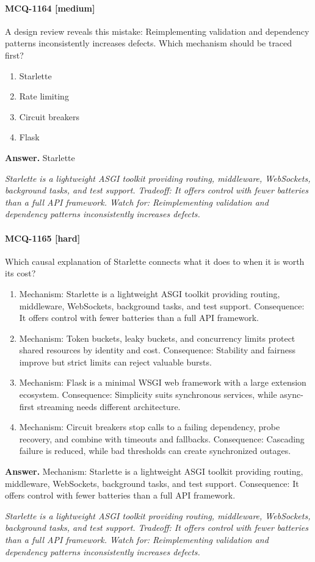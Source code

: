 \paragraph{MCQ-1164 [medium]} A design review reveals this mistake: Reimplementing validation and dependency patterns inconsistently increases defects. Which mechanism should be traced first?
\begin{enumerate}[label=\Alph*.]
\item Starlette
\item Rate limiting
\item Circuit breakers
\item Flask
\end{enumerate}
\noindent\textbf{Answer.} Starlette
\par\textit{Starlette is a lightweight ASGI toolkit providing routing, middleware, WebSockets, background tasks, and test support. Tradeoff: It offers control with fewer batteries than a full API framework. Watch for: Reimplementing validation and dependency patterns inconsistently increases defects.}
\paragraph{MCQ-1165 [hard]} Which causal explanation of Starlette connects what it does to when it is worth its cost?
\begin{enumerate}[label=\Alph*.]
\item Mechanism: Starlette is a lightweight ASGI toolkit providing routing, middleware, WebSockets, background tasks, and test support. Consequence: It offers control with fewer batteries than a full API framework.
\item Mechanism: Token buckets, leaky buckets, and concurrency limits protect shared resources by identity and cost. Consequence: Stability and fairness improve but strict limits can reject valuable bursts.
\item Mechanism: Flask is a minimal WSGI web framework with a large extension ecosystem. Consequence: Simplicity suits synchronous services, while async-first streaming needs different architecture.
\item Mechanism: Circuit breakers stop calls to a failing dependency, probe recovery, and combine with timeouts and fallbacks. Consequence: Cascading failure is reduced, while bad thresholds can create synchronized outages.
\end{enumerate}
\noindent\textbf{Answer.} Mechanism: Starlette is a lightweight ASGI toolkit providing routing, middleware, WebSockets, background tasks, and test support. Consequence: It offers control with fewer batteries than a full API framework.
\par\textit{Starlette is a lightweight ASGI toolkit providing routing, middleware, WebSockets, background tasks, and test support. Tradeoff: It offers control with fewer batteries than a full API framework. Watch for: Reimplementing validation and dependency patterns inconsistently increases defects.}
